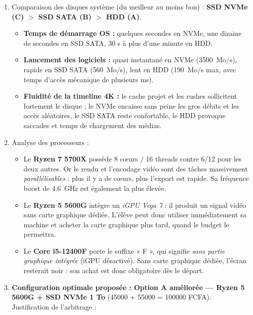 \documentclass[11pt]{article}
\begin{document}
\begin{corrige}
\begin{enumerate}
    \item Comparaison des disques système (du meilleur au moins bon) : \textbf{SSD NVMe (C) $>$ SSD SATA (B) $>$ HDD (A)}.
    \begin{itemize}
        \item \textbf{Temps de démarrage OS :} quelques secondes en NVMe, une dizaine de secondes en SSD SATA, 30 s à plus d'une minute en HDD.
        \item \textbf{Lancement des logiciels :} quasi instantané en NVMe (\SI{3500}{Mo/s}), rapide en SSD SATA (\SI{560}{Mo/s}), lent en HDD (\SI{190}{Mo/s} max, avec temps d'accès mécanique de plusieurs ms).
        \item \textbf{Fluidité de la timeline 4K :} le cache projet et les rushes sollicitent fortement le disque ; le NVMe encaisse sans peine les gros débits et les accès aléatoires, le SSD SATA reste confortable, le HDD provoque saccades et temps de chargement des médias.
    \end{itemize}
    \item Analyse des processeurs :
    \begin{itemize}
        \item[a)] Le \textbf{Ryzen 7 5700X} possède 8 cœurs / 16 threads contre 6/12 pour les deux autres. Or le rendu et l'encodage vidéo sont des tâches massivement \emph{parallélisables} : plus il y a de cœurs, plus l'export est rapide. Sa fréquence boost de \SI{4,6}{\giga\hertz} est également la plus élevée.
        \item[b)] Le \textbf{Ryzen 5 5600G} intègre un \emph{iGPU Vega 7} : il produit un signal vidéo sans carte graphique dédiée. L'élève peut donc utiliser immédiatement sa machine et acheter la carte graphique plus tard, quand le budget le permettra.
        \item[c)] Le \textbf{Core i5-12400F} porte le suffixe « F », qui signifie \emph{sans partie graphique intégrée} (iGPU désactivé). Sans carte graphique dédiée, l'écran resterait noir : son achat est donc obligatoire dès le départ.
    \end{itemize}
    \item \textbf{Configuration optimale proposée : Option A améliorée — Ryzen 5 5600G + SSD NVMe 1 To} (\num{45000} + \num{55000} = \num{100000} FCFA). Justification de l'arbitrage :
    \begin{itemize}

\end{itemize}
\end{enumerate}
\end{corrige}
\end{document}
